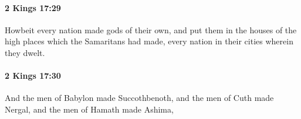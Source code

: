 		\paragraph{2 Kings 17:29} %
			\label{2KINGS-17-29}

			Howbeit every nation made gods of their own, and put them in the houses of the high places which the Samaritans had made, every nation in their cities wherein they dwelt.


		\paragraph{2 Kings 17:30} %
			\label{2KINGS-17-30}

			And the men of Babylon made Succothbenoth, and the men of Cuth made Nergal, and the men of Hamath made Ashima,


